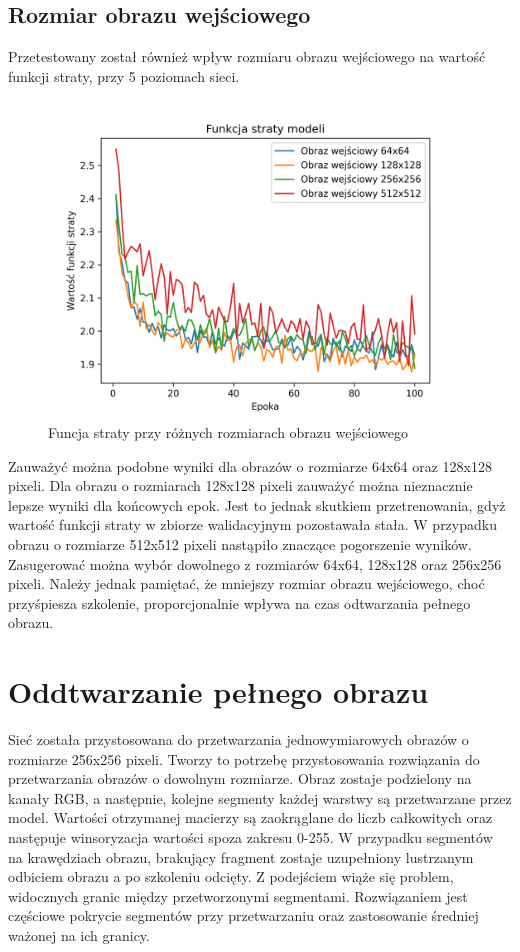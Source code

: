 \documentclass[a4paper,11pt]{article}
\begin{document}
\subsection{Rozmiar obrazu wejściowego}
Przetestowany został również wpływ rozmiaru obrazu wejściowego na wartość funkcji straty, przy 5 poziomach sieci.
\\
\begin{figure}[h!]
\begin{center}
	\includegraphics[width=0.7\columnwidth]{size.png}
	\caption{Funcja straty przy różnych rozmiarach obrazu wejściowego}
\end{center}
\end{figure}
Zauważyć można podobne wyniki dla obrazów o rozmiarze 64x64 oraz 128x128 pixeli.
Dla obrazu o rozmiarach 128x128 pixeli zauważyć można nieznacznie lepsze wyniki dla końcowych epok.
Jest to jednak skutkiem przetrenowania, gdyż wartość funkcji straty w zbiorze walidacyjnym pozostawała stała.
W przypadku obrazu o rozmiarze 512x512 pixeli nastąpiło znaczące pogorszenie wyników.
Zasugerować można wybór dowolnego z rozmiarów 64x64, 128x128 oraz 256x256 pixeli.
Należy jednak pamiętać, że mniejszy rozmiar obrazu wejściowego, choć przyśpiesza szkolenie,
proporcjonalnie wpływa na czas odtwarzania pełnego obrazu.

\section{Oddtwarzanie pełnego obrazu}
Sieć została przystosowana do przetwarzania jednowymiarowych obrazów o rozmiarze 256x256 pixeli.
Tworzy to potrzebę przystosowania rozwiązania do przetwarzania obrazów o dowolnym rozmiarze.
Obraz zostaje podzielony na kanały RGB, a następnie, kolejne segmenty każdej warstwy są przetwarzane przez model.
Wartości otrzymanej macierzy są zaokrąglane do liczb całkowitych oraz następuje winsoryzacja wartości spoza zakresu 0-255.
W przypadku segmentów na krawędziach obrazu, brakujący fragment zostaje uzupełniony lustrzanym odbiciem obrazu a po szkoleniu odcięty.
Z podejściem wiąże się problem, widocznych granic między przetworzonymi segmentami.
Rozwiązaniem jest częściowe pokrycie segmentów przy przetwarzaniu oraz zastosowanie średniej ważonej na ich granicy.
\end{document}
